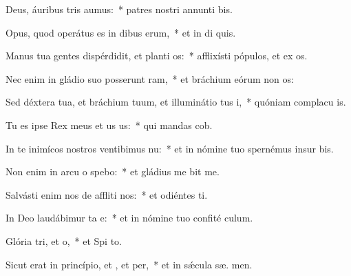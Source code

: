 \item Deus, áuribus tris aumus:~* patres nostri annunti bis.
\item Opus, quod operátus es in dibus erum,~* et in di quis.
\item Manus tua gentes dispérdidit, et planti os:~* afflixísti pópulos, et ex os.
\item Nec enim in gládio suo posserunt ram,~* et bráchium eórum non  os:
\item Sed déxtera tua, et bráchium tuum, et illuminátio tus i,~* quóniam complacu  is.
\item Tu es ipse Rex meus et us us:~* qui mandas  cob.
\item In te inimícos nostros ventibimus nu:~* et in nómine tuo spernémus insur  bis.
\item Non enim in arcu o spebo:~* et gládius me  bit me.
\item Salvásti enim nos de affliti nos:~* et odiéntes  ti.
\item In Deo laudábimur ta e:~* et in nómine tuo confité  culum.
\item Glória tri, et o,~* et Spi to.
\item Sicut erat in princípio, et , et per,~* et in sǽcula sæ. men.

